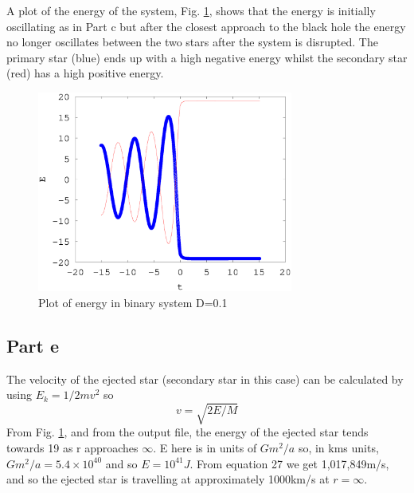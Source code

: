 \documentclass[a4paper,12pt]{article}
\begin{document}
A plot of the energy of the system, Fig. \ref{fig:problem3_6}, shows that the energy is initially oscillating as in Part c but after the closest approach to the black hole the energy no longer oscillates between the two stars after the system is disrupted. The primary star (blue) ends up with a high negative energy whilst the secondary star (red) has a high positive energy.
\begin{figure}[H]
\centering
\includegraphics[width=0.75\textwidth]{./problem3/problem3_6}
\caption{Plot of energy in binary system D=0.1}
\label{fig:problem3_6}
\end{figure}

\subsection{Part e}
The velocity of the ejected star (secondary star in this case) can be calculated by using $E_k=1/2mv^2$ so
\begin{equation}
v=\sqrt{2E/M}
\end{equation}
From Fig. \ref{fig:problem3_6}, and from the output file, the energy of the ejected star tends towards 19 as r approaches $\infty$. E here is in units of $Gm^2/a$ so, in kms units, $Gm^2/a=5.4\times10^{40}$ and so $E=10^{41}J$. From equation 27 we get 1,017,849m/s, and so the ejected star is travelling at approximately 1000km/s at $r=\infty$.
\end{document}
